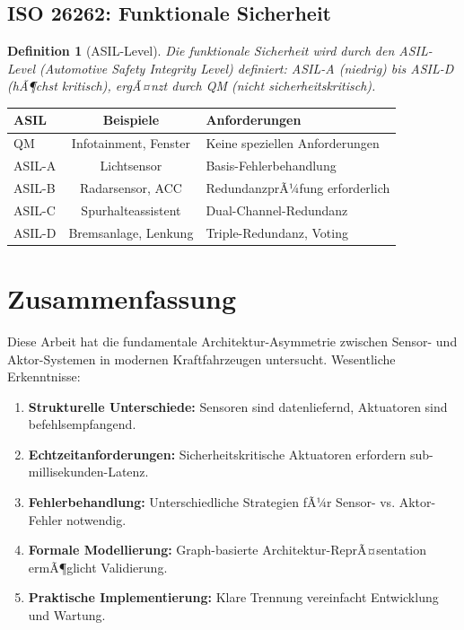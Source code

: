 ﻿\documentclass[a4paper,12pt]{article}
\newtheorem{definition}{Definition}
\begin{document}
\subsection{ISO 26262: Funktionale Sicherheit}

\begin{definition}[ASIL-Level]
Die funktionale Sicherheit wird durch den ASIL-Level (Automotive Safety Integrity 
Level) definiert: ASIL-A (niedrig) bis ASIL-D (hÃ¶chst kritisch), ergÃ¤nzt durch 
QM (nicht sicherheitskritisch).
\end{definition}

\begin{table}[h]
\centering
\begin{tabular}{|l|c|l|}
\hline
\textbf{ASIL} & \textbf{Beispiele} & \textbf{Anforderungen} \\
\hline
QM & Infotainment, Fenster & Keine speziellen Anforderungen \\
ASIL-A & Lichtsensor & Basis-Fehlerbehandlung \\
ASIL-B & Radarsensor, ACC & RedundanzprÃ¼fung erforderlich \\
ASIL-C & Spurhalteassistent & Dual-Channel-Redundanz \\
ASIL-D & Bremsanlage, Lenkung & Triple-Redundanz, Voting \\
\hline
\end{tabular}
\end{table}

\section{Zusammenfassung}

Diese Arbeit hat die fundamentale Architektur-Asymmetrie zwischen Sensor- und 
Aktor-Systemen in modernen Kraftfahrzeugen untersucht. Wesentliche Erkenntnisse:

\begin{enumerate}
	\item \textbf{Strukturelle Unterschiede:} Sensoren sind datenliefernd, Aktuatoren 
	sind befehlsempfangend.
	
	\item \textbf{Echtzeitanforderungen:} Sicherheitskritische Aktuatoren erfordern 
	sub-millisekunden-Latenz.
	
	\item \textbf{Fehlerbehandlung:} Unterschiedliche Strategien fÃ¼r Sensor- vs. 
	Aktor-Fehler notwendig.
	
	\item \textbf{Formale Modellierung:} Graph-basierte Architektur-ReprÃ¤sentation 
	ermÃ¶glicht Validierung.
	
	\item \textbf{Praktische Implementierung:} Klare Trennung vereinfacht Entwicklung 
	und Wartung.
\end{enumerate}
\end{document}

